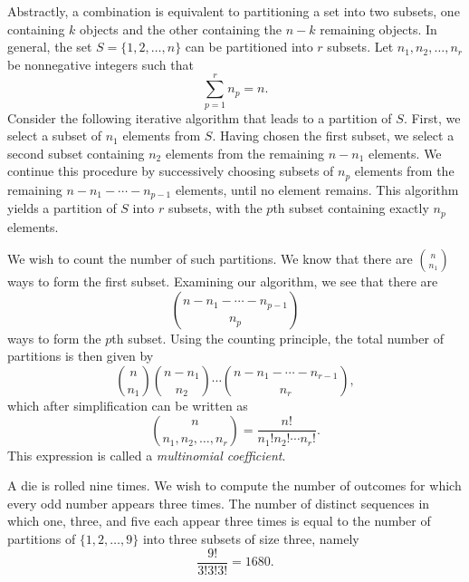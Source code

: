 Abstractly, a combination is equivalent to partitioning a set into two subsets, one containing $k$ objects and the other containing the $n-k$ remaining objects.
In general, the set $S = \{ 1, 2, \ldots, n \}$ can be partitioned into $r$ subsets.
Let $n_1, n_2, \ldots, n_r$ be nonnegative integers such that
\begin{equation*}
\sum_{p = 1}^r n_p = n.
\end{equation*}
Consider the following iterative algorithm that leads to a partition of $S$.
First, we select a subset of $n_1$ elements from $S$.
Having chosen the first subset, we select a second subset containing $n_2$ elements from the remaining $n - n_1$ elements.
We continue this procedure by successively choosing subsets of $n_p$ elements from the remaining $n - n_1 - \cdots - n_{p-1}$ elements, until no element remains.
This algorithm yields a partition of $S$ into $r$ subsets, with the $p$th subset containing exactly $n_p$ elements.

We wish to count the number of such partitions.
We know that there are $\binom{n}{n_1}$ ways to form the first subset.
Examining our algorithm, we see that there are
\begin{equation*}
\binom{n - n_1 - \cdots - n_{p-1}}{n_p}
\end{equation*}
ways to form the $p$th subset.
Using the counting principle, the total number of partitions is then given by
\begin{equation*}
\binom{n}{n_1} \binom{n - n_1}{n_2}
\cdots \binom{n - n_1 - \cdots - n_{r-1}}{n_r},
\end{equation*}
which after simplification can be written as
\begin{equation*}
\binom{n}{n_1, n_2, \ldots, n_r}
= \frac{n!}{n_1! n_2! \cdots n_r!} .
\end{equation*}
This expression is called a \emph{multinomial coefficient}.

\begin{example}
A die is rolled nine times.
We wish to compute the number of outcomes for which every odd number appears three times.
The number of distinct sequences in which one, three, and five each appear three times is equal to the number of partitions of $\{ 1, 2, \ldots, 9 \}$ into three subsets of size three, namely
\begin{equation*}
\frac{9!}{3! 3! 3!} = 1680 .
\end{equation*}
\end{example}

